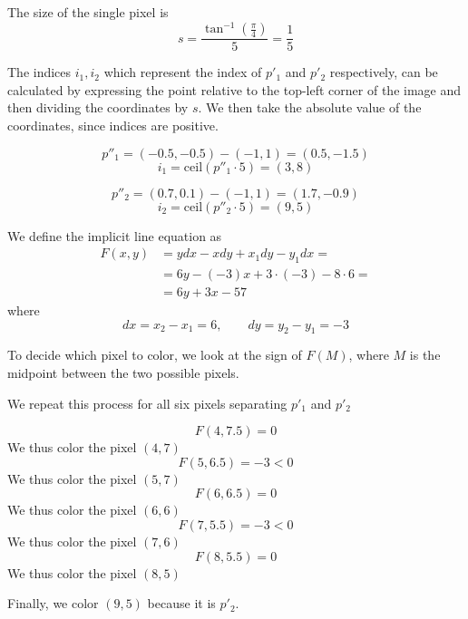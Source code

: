 \documentclass[a4paper, 11pt]{article}
\newcommand{\ceil}{\text{ceil}}
\newcommand{\abs}{\text{abs}}
\begin{document}
The size of the single pixel is
$$ s = \frac{\tan^{-1}\left(\frac{\pi}{4}\right)}{5} = \frac{1}{5}$$

The indices $i_1, i_2$ which represent the index of $p'_1$ and $p'_2$
respectively, can be calculated by expressing the point relative to the top-left
corner of the image and then dividing the coordinates by $s$. We then take the
absolute value of the coordinates, since indices are positive.


$$ p''_1 = (-0.5, -0.5) - (-1, 1) = (0.5, -1.5) $$
$$ i_1 = \ceil(p''_1 \cdot 5) = (3, 8) $$

$$ p''_2 = (0.7, 0.1) - (-1, 1) = (1.7, -0.9) $$
$$ i_2 = \ceil(p''_2 \cdot 5) = (9, 5) $$

We define the implicit line equation as
\begin{align*}
	F(x, y) & = ydx - xdy + x_1dy - y_1dx =            \\
	        & = 6y - (-3)x + 3\cdot (-3) - 8 \cdot 6 = \\
	        & = 6y + 3x - 57
\end{align*}
where
$$ dx = x_2 - x_1 = 6, \qquad dy = y_2 - y_1 = -3 $$

To decide which pixel to color, we look at the sign of $F(M)$, where $M$ is the
midpoint between the two possible pixels.

We repeat this process for all six pixels separating $p'_1$  and $p'_2$

$$ F(4, 7.5) = 0  $$
We thus color the pixel $(4, 7)$
$$ F(5, 6.5) = -3 < 0 $$
We thus color the pixel $(5, 7)$
$$ F(6, 6.5) = 0  $$
We thus color the pixel $(6, 6)$
$$ F(7, 5.5) = -3 < 0  $$
We thus color the pixel $(7, 6)$
$$ F(8, 5.5) = 0  $$
We thus color the pixel $(8, 5)$

Finally, we color $(9, 5)$ because it is $p'_2$.
\end{document}
